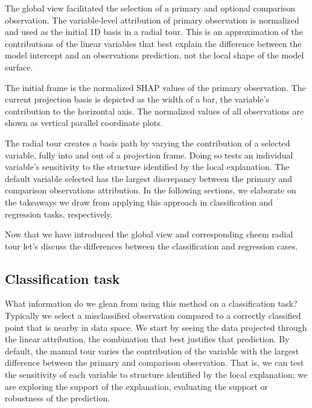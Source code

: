\documentclass[
  article]{article}
\begin{document}
The global view facilitated the selection of a primary and optional comparison observation. The variable-level attribution of primary observation is normalized and used as the initial 1D basis in a radial tour. This is an approximation of the contributions of the linear variables that best explain the difference between the model intercept and an observations prediction, not the local shape of the model surface.

The initial frame is the normalized SHAP values of the primary observation. The current projection basis is depicted as the width of a bar, the variable's contribution to the horizontal axis. The normalized values of all observations are shown as vertical parallel coordinate plots.

The radial tour creates a basis path by varying the contribution of a selected variable, fully into and out of a projection frame. Doing so tests an individual variable's sensitivity to the structure identified by the local explanation. The default variable selected has the largest discrepancy between the primary and comparison observations attribution. In the following sections, we elaborate on the takeaways we draw from applying this approach in classification and regression tasks, respectively.

Now that we have introduced the global view and corresponding cheem radial tour let's discuss the differences between the classification and regression cases.

\hypertarget{classification-task}{%
\subsection{Classification task}\label{classification-task}}

What information do we glean from using this method on a classification task? Typically we select a misclassified observation compared to a correctly classified point that is nearby in data space. We start by seeing the data projected through the linear attribution, the combination that best justifies that prediction. By default, the manual tour varies the contribution of the variable with the largest difference between the primary and comparison observation. That is, we can test the sensitivity of each variable to structure identified by the local explanation; we are exploring the support of the explanation, evaluating the support or robustness of the prediction.
\end{document}
